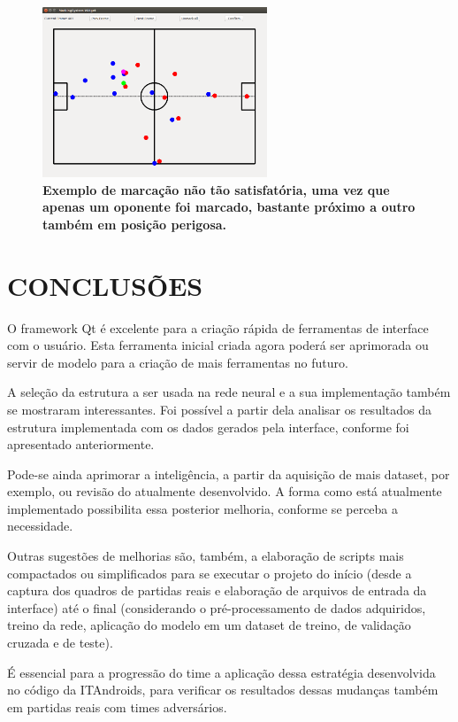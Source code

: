 \documentclass[10pt,fleqn,a4paper]{article}
\begin{document}
\begin{figure}[H]
	\centering
	\includegraphics[width=0.6\textwidth]{figures/frame461.png}
   \caption{\textbf{Exemplo de marcação não tão satisfatória, uma vez que apenas um oponente foi marcado, bastante próximo a outro também em posição perigosa.}} \label{fig:frame461}
\end{figure}

    \section{CONCLUSÕES}
    
    O framework Qt é excelente para a criação rápida de ferramentas de interface com o usuário. Esta ferramenta inicial criada agora poderá ser aprimorada ou servir de modelo para a criação de mais ferramentas no futuro.
    
    A seleção da estrutura a ser usada na rede neural e a sua implementação também se mostraram interessantes. Foi possível a partir dela analisar os resultados da estrutura implementada com os dados gerados pela interface, conforme foi apresentado anteriormente.

	Pode-se ainda aprimorar a inteligência, a partir da aquisição de mais dataset, por exemplo, ou revisão do atualmente desenvolvido. A forma como está atualmente implementado possibilita essa posterior melhoria, conforme se perceba a
necessidade.

	Outras sugestões de melhorias são, também, a elaboração de scripts mais compactados ou simplificados para se executar o projeto do início (desde a captura dos quadros de partidas reais e elaboração de arquivos de entrada da interface) até o final (considerando o pré-processamento de dados adquiridos, treino da rede, aplicação do modelo em um dataset de treino, de validação cruzada e de teste).
	
	É essencial para a progressão do time a aplicação dessa estratégia desenvolvida no código da ITAndroids, para verificar os resultados dessas mudanças também em partidas reais com times adversários.
\end{document}
